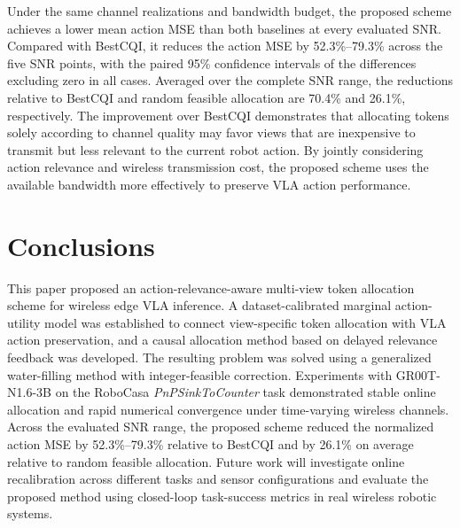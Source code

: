 \documentclass[lettersize,journal]{IEEEtran}
\theoremstyle{custom}
\begin{document}
Under the same channel realizations and bandwidth budget, the proposed
scheme achieves a lower mean action MSE than both baselines at every
evaluated SNR. Compared with BestCQI, it reduces the action MSE by
52.3\%--79.3\% across the five SNR points, with the paired 95\%
confidence intervals of the differences excluding zero in all cases.
Averaged over the complete SNR range, the reductions relative to
BestCQI and random feasible allocation are 70.4\% and 26.1\%,
respectively. The improvement over BestCQI demonstrates that allocating
tokens solely according to channel quality may favor views that are
inexpensive to transmit but less relevant to the current robot action.
By jointly considering action relevance and wireless transmission
cost, the proposed scheme uses the available bandwidth more effectively
to preserve VLA action performance.

\section{Conclusions}

This paper proposed an action-relevance-aware multi-view token
allocation scheme for wireless edge VLA inference. A
dataset-calibrated marginal action-utility model was established to
connect view-specific token allocation with VLA action preservation,
and a causal allocation method based on delayed relevance feedback
was developed. The resulting problem was solved using a generalized
water-filling method with integer-feasible correction. Experiments
with GR00T-N1.6-3B on the RoboCasa \emph{PnPSinkToCounter} task
demonstrated stable online allocation and rapid numerical convergence
under time-varying wireless channels. Across the evaluated SNR range,
the proposed scheme reduced the normalized action MSE by
52.3\%--79.3\% relative to BestCQI and by 26.1\% on average relative
to random feasible allocation. Future work will investigate online
recalibration across different tasks and sensor configurations and
evaluate the proposed method using closed-loop task-success metrics
in real wireless robotic systems.

\appendices
\end{document}
